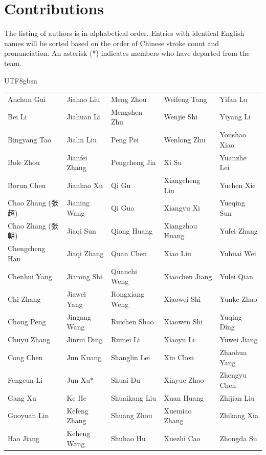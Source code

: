 \section{Contributions}

The listing of authors is in alphabetical order.
Entries with identical English names will be sorted based on the order of Chinese stroke count and pronunciation.
An asterisk (*) indicates members who have departed from the team.



\begin{CJK}{UTF8}{gbsn}

\begin{center}
\begin{tabular}{p{}p{}p{}p{}p{}}
Anchun Gui & Jiahao Liu & Meng Zhou & Weifeng Tang & Yifan Lu \\
Bei Li & Jiahuan Li & Mengshen Zhu & Wenjie Shi & Yiyang Li \\
Bingyang Tao & Jialin Liu & Peng Pei & Wenlong Zhu & Youshao Xiao \\
Bole Zhou & Jianfei Zhang & Pengcheng Jia & Xi Su & Yuanzhe Lei \\
Borun Chen & Jianhao Xu & Qi Gu & Xiangcheng Liu & Yuchen Xie \\
Chao Zhang (张超) & Jianing Wang & Qi Guo & Xiangyu Xi & Yueqing Sun \\
Chao Zhang (张朝) & Jiaqi Sun & Qiong Huang & Xiangzhou Huang & Yufei Zhang \\
Chengcheng Han & Jiaqi Zhang & Quan Chen & Xiao Liu & Yuhuai Wei \\
Chenhui Yang & Jiarong Shi & Quanchi Weng & Xiaochen Jiang & Yulei Qian \\
Chi Zhang & Jiawei Yang & Rongxiang Weng & Xiaowei Shi & Yunke Zhao \\
Chong Peng & Jingang Wang & Ruichen Shao & Xiaowen Shi & Yuqing Ding \\
Chuyu Zhang & Jinrui Ding & Rumei Li & Xiaoyu Li & Yuwei Jiang \\
Cong Chen & Jun Kuang & Shanglin Lei & Xin Chen & Zhaohua Yang \\
Fengcun Li & Jun Xu* & Shuai Du & Xinyue Zhao & Zhengyu Chen \\
Gang Xu & Ke He & Shuaikang Liu & Xuan Huang & Zhijian Liu \\
Guoyuan Lin & Kefeng Zhang & Shuang Zhou & Xuemiao Zhang & Zhikang Xia \\
Hao Jiang & Keheng Wang & Shuhao Hu & Xuezhi Cao & Zhongda Su \\

\end{tabular}
\end{center}
\end{CJK}
